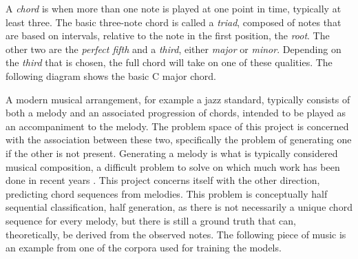 \documentclass[bsc,singlespacing,logo, parskip, deptreport]{infthesis}
\begin{document}
\begin{center}
\end{center}

A {\em chord} is when more than one note is played at one point in time, typically at least three. The basic three-note chord is called a {\em triad}, composed of notes that are based on intervals, relative to the note in the first position, the {\em root}. The other two are the {\em perfect fifth} and a {\em third}, either {\em major} or {\em minor}. Depending on the {\em third} that is chosen, the full chord will take on one of these qualities. The following diagram shows the basic C major chord.

\begin{center}
\end{center}

A modern musical arrangement, for example a jazz standard, typically consists of both a melody and an associated progression of chords, intended to be played as an accompaniment to the melody. The problem space of this project is concerned with the association between these two, specifically the problem of generating one if the other is not present. Generating a melody is what is typically considered musical composition, a difficult problem to solve on which much work has been done in recent years \cite{conklin2003music} \cite{nierhaus2009algorithmic} \cite{inesta2016machine} \cite{whorley2016music}. This project concerns itself with the other direction, predicting chord sequences from melodies. This problem is conceptually half sequential classification, half generation, as there is not necessarily a unique chord sequence for every melody, but there is still a ground truth that can, theoretically, be derived from the observed notes. The following piece of music is an example from one of the corpora used for training the models.

\begin{center}
\end{center}
\end{document}
